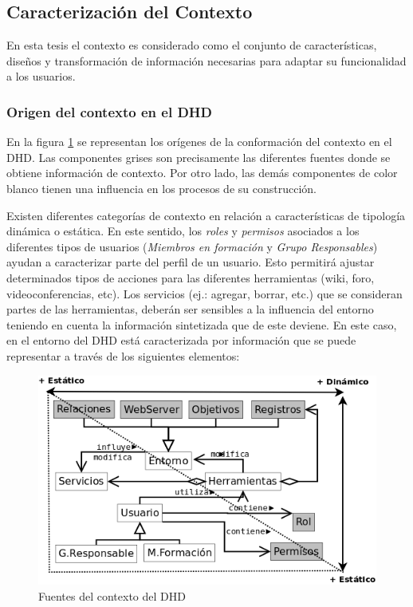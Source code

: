 \subsection {Caracterización del Contexto}

En esta tesis el contexto es considerado como  el conjunto de características, diseños y transformación de información necesarias para adaptar su funcionalidad a los usuarios. 

\subsubsection{Origen del contexto en el DHD}

En la figura \ref{fig:ontologiaContexto} se representan los orígenes de la conformación del contexto en el DHD. Las componentes grises son precisamente las diferentes fuentes donde se obtiene información de contexto. Por otro lado, las demás componentes de color blanco tienen una influencia en los procesos de su construcción. 

Existen diferentes categorías de contexto en relación a características de tipología dinámica o estática. En este sentido, los \textit{roles} y \textit{permisos} asociados a los diferentes tipos de usuarios (\textit{Miembros en formación} y \textit{Grupo Responsables}) ayudan a
caracterizar parte del perfil de un usuario. Esto permitirá ajustar determinados tipos de acciones para las diferentes herramientas (wiki, foro, videoconferencias, etc). Los servicios (ej.: agregar, borrar, etc.) que se consideran partes de las herramientas, deberán ser sensibles a la influencia del entorno teniendo en cuenta la información sintetizada que de este deviene. En este caso, en el entorno del DHD está caracterizada por información que se puede representar a través de los siguientes elementos: 


\begin{figure} 
\begin{center}
 \includegraphics [width=5 in,totalheight=3 in] {Ch1/Figuras/contexto.png}
\caption {Fuentes del contexto del DHD}
\label{fig:ontologiaContexto}
\end{center}
\end{figure}



